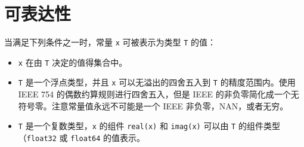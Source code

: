 \section{可表达性}
当满足下列条件之一时，常量 \lstinline|x| 可被表示为类型 \lstinline|T| 的值：
\begin{itemize}
\item \lstinline|x| 在由 \lstinline|T| 决定的值得集合中。
\item  \lstinline|T| 是一个浮点类型，并且 \lstinline|x| 可以无溢出的四舍五入到 \lstinline|T| 的精度范围内。使用 IEEE 754 的偶数约算规则进行四舍五入，但是 IEEE 的非负零简化成一个无符号零。注意常量值永远不可能是一个 IEEE 非负零，NAN，或者无穷。
\item \lstinline|T| 是一个复数类型，\lstinline|x| 的组件 \lstinline|real(x)| 和 \lstinline|imag(x)| 可以由 \lstinline|T| 的组件类型（\lstinline|float32| 或 \lstinline|float64| 的值表示。
\end{itemize}
